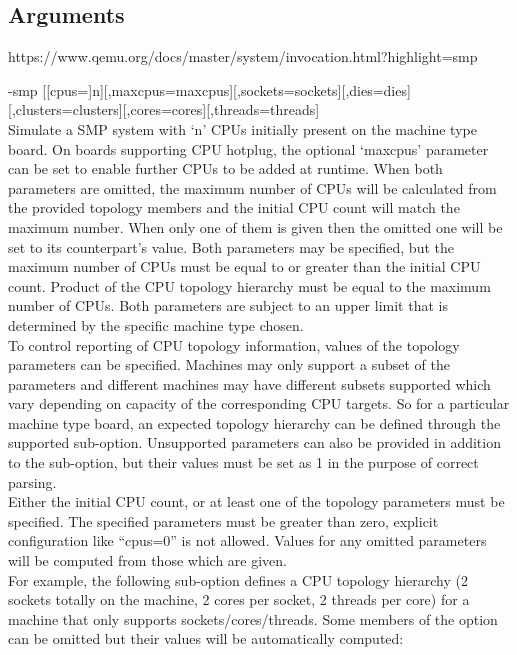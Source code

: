 \documentclass[11pt, a4paper, oneside]{article}
\theoremstyle{definition}
\begin{document}
\subsection{Arguments}
https://www.qemu.org/docs/master/system/invocation.html?highlight=smp

-smp [[cpus=]n][,maxcpus=maxcpus][,sockets=sockets][,dies=dies][,clusters=clusters][,cores=cores][,threads=threads]\\

    Simulate a SMP system with ‘n’ CPUs initially present on the machine type board. On boards supporting CPU hotplug, the optional ‘maxcpus’ parameter can be set to enable further CPUs to be added at runtime. When both parameters are omitted, the maximum number of CPUs will be calculated from the provided topology members and the initial CPU count will match the maximum number. When only one of them is given then the omitted one will be set to its counterpart’s value. Both parameters may be specified, but the maximum number of CPUs must be equal to or greater than the initial CPU count. Product of the CPU topology hierarchy must be equal to the maximum number of CPUs. Both parameters are subject to an upper limit that is determined by the specific machine type chosen.\\

    To control reporting of CPU topology information, values of the topology parameters can be specified. Machines may only support a subset of the parameters and different machines may have different subsets supported which vary depending on capacity of the corresponding CPU targets. So for a particular machine type board, an expected topology hierarchy can be defined through the supported sub-option. Unsupported parameters can also be provided in addition to the sub-option, but their values must be set as 1 in the purpose of correct parsing.\\

    Either the initial CPU count, or at least one of the topology parameters must be specified. The specified parameters must be greater than zero, explicit configuration like “cpus=0” is not allowed. Values for any omitted parameters will be computed from those which are given.\\

    For example, the following sub-option defines a CPU topology hierarchy (2 sockets totally on the machine, 2 cores per socket, 2 threads per core) for a machine that only supports sockets/cores/threads. Some members of the option can be omitted but their values will be automatically computed:\\
\end{document}
